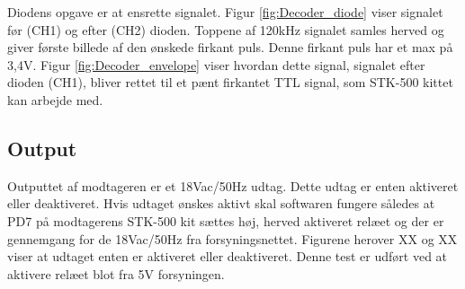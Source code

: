 Diodens opgave er at ensrette signalet. Figur \ref{fig:Decoder_diode} viser signalet før (CH1) og efter (CH2) dioden. Toppene af 120kHz signalet samles herved og giver første billede af den ønskede firkant puls. Denne firkant puls har et max på 3,4V. Figur \ref{fig:Decoder_envelope} viser hvordan dette signal, signalet efter dioden (CH1), bliver rettet til et pænt firkantet TTL signal, som STK-500 kittet kan arbejde med. 
  

\subsection{Output}



Outputtet af modtageren er et 18Vac/50Hz udtag. Dette udtag er enten aktiveret eller deaktiveret. Hvis udtaget ønskes aktivt skal softwaren fungere således at PD7 på modtagerens STK-500 kit sættes høj, herved aktiveret relæet og der er gennemgang for de 18Vac/50Hz fra forsyningsnettet. Figurene herover XX og XX viser at udtaget enten er aktiveret eller deaktiveret. Denne test er udført ved at aktivere relæet blot fra 5V forsyningen.   




\clearpage